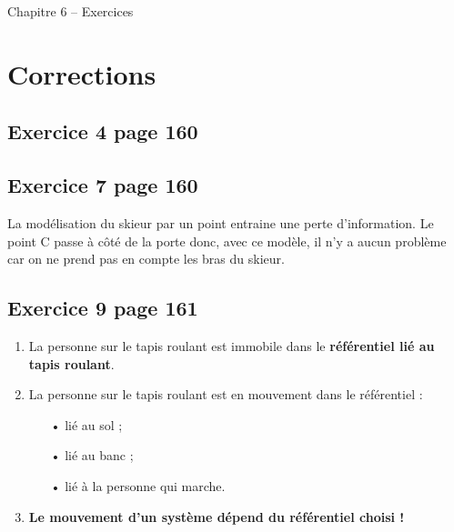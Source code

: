 \documentclass[12pt,a4paper,fleqn]{article}
\begin{document}
\begin{header}
Chapitre 6 -- Exercices
\end{header}

\section*{Corrections}

\subsection*{Exercice 4 page 160}

\begin{center}
\end{center}

\subsection*{Exercice 7 page 160}

La modélisation du skieur par un point entraine une perte d'information.
Le point C passe à côté de la porte donc, avec ce modèle, il n'y a aucun problème car on ne prend pas en compte les bras du skieur.

\subsection*{Exercice 9 page 161}

\begin{enumerate}
\item La personne sur le tapis roulant est immobile dans le \textbf{référentiel lié au tapis roulant}.
\item La personne sur le tapis roulant est en mouvement dans le référentiel :
\begin{itemize}
\item[•] lié au sol ;
\item[•] lié au banc ;
\item[•] lié à la personne qui marche.
\end{itemize}
\item \textbf{Le mouvement d'un système dépend du référentiel choisi !}
\end{enumerate}
\end{document}

